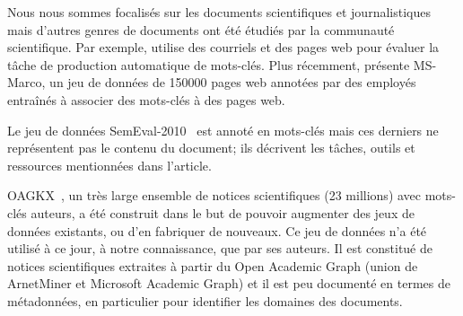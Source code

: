 Nous nous sommes focalisés sur les documents scientifiques et journalistiques mais d'autres genres de documents ont été étudiés par la communauté scientifique. Par exemple, \citet{turney_learning_2000} utilise des courriels et des pages web pour évaluer la tâche de production automatique de mots-clés. Plus récemment, \citet{xiong_open_2019} présente MS-Marco, un jeu de données de \num{150 000} pages web annotées par des employés entraînés à associer des mots-clés à des pages web.

Le jeu de données SemEval-2010~\cite{augenstein_semeval_2017} est annoté en mots-clés mais ces derniers ne représentent pas le contenu du document; ils décrivent les tâches, outils et ressources mentionnées dans l'article. 

OAGKX~\cite{cano_keyphrase_2019-1}, un très large ensemble de notices scientifiques (23 millions) avec mots-clés auteurs, a été construit dans le but de pouvoir augmenter des jeux de données existants, ou d'en fabriquer de nouveaux.
Ce jeu de données n'a été utilisé à ce jour, à notre connaissance, que par ses auteurs.
Il est constitué de notices scientifiques extraites à partir du Open Academic Graph (union de ArnetMiner et Microsoft Academic Graph) et il est peu documenté en termes de métadonnées, en particulier pour identifier les domaines des documents.



